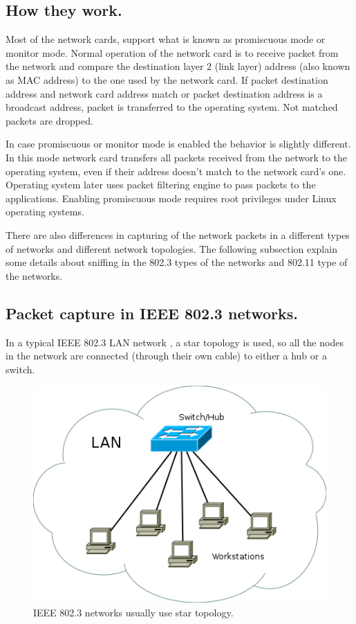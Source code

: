 \documentclass[thesis=M,english]{FITthesis}[2011/07/15]
\begin{document}
\subsection{How they work.}
Most of the network cards, support what is known as promiscuous mode or monitor mode. Normal operation of the network card is to receive packet from the network and compare the destination layer 2 (link layer) address (also known as MAC address) to the one used by the network card. If packet destination address and network card address match or packet destination address is a broadcast address, packet is transferred to the operating system. Not matched packets are dropped.

In case promiscuous or monitor mode is enabled the behavior is slightly different. In this mode network card transfers all packets received from the network to the operating system, even if their address doesn't match to the network card's one. Operating system later uses packet filtering engine to pass packets to the applications. Enabling promiscuous mode requires root privileges under Linux operating systems.

There are also differences in capturing of the network packets in a different types of networks and different network topologies. The following subsection explain some details about sniffing in the 802.3 types of the networks and 802.11 type of the networks.

\subsection{Packet capture in IEEE 802.3 networks.}
In a typical IEEE 802.3 LAN network \cite{ieee_802_3}, a star topology is used, so all the nodes in the network are connected (through their own cable) to either a hub or a switch.
\begin{figure}[h]
\centering
\includegraphics[scale=0.45]{images/IEEE802_3_LAN.png}
\caption{IEEE 802.3 networks usually use star topology.}
\label{fig:ieee802.3star_topology}
\end{figure}
\end{document}
